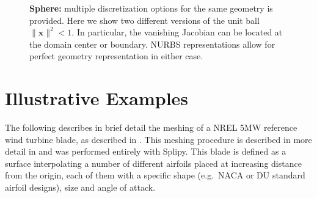 \documentclass[preprint,12pt, a4paper]{elsarticle}
\begin{document}
\begin{figure}
  \begin{center}
    \hspace{.02\linewidth}
    \caption{\textbf{Sphere:} multiple discretization options for the same geometry is provided. Here we show two different versions of the unit ball $\|\mathbf{x}\|^2<1$. In particular, the vanishing Jacobian can be located at the domain center or boundary. NURBS representations allow for perfect geometry representation in either case.}
    \label{fig:volume-disc}
  \end{center}
\end{figure}

\section{Illustrative Examples}
\label{sec:naca}

The following describes in brief detail the meshing of a NREL 5MW reference wind turbine blade, as described in \cite{Jonkman2009drw}.
This meshing procedure is described in more detail in \cite{Fonn2015sbm} and was performed entirely with Splipy.
This blade is defined as a surface interpolating a number of different airfoils placed at increasing distance from the origin, each of them with a specific shape (e.g.~NACA or DU standard airfoil designs), size and angle of attack.
\end{document}
